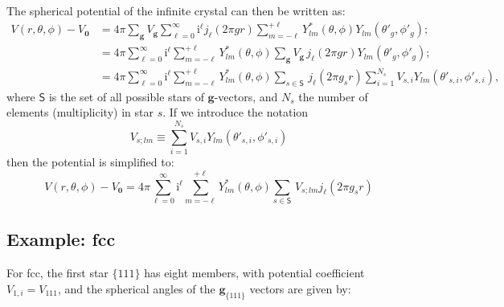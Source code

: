 \documentclass[11pt]{amsart}
\begin{document}
The spherical potential of the infinite crystal can then be written as:
\begin{align}
	V(r,\theta,\phi) - V_{\mathbf{0}} &= 
4\pi \sum_{\mathbf{g}} V_{\mathbf{g}}\sum_{\ell=0}^{\infty} \mathrm{i}^{\ell}j_{\ell}(2\pi gr)\sum_{m=-\ell}^{+\ell} Y^{\ast}_{lm}(\theta,\phi)Y_{lm}(\theta'_g,\phi'_g);\\
&= 4\pi \sum_{\ell=0}^{\infty} \mathrm{i}^{\ell} \sum_{m=-\ell}^{+\ell} Y^{\ast}_{lm}(\theta,\phi) \sum_{\mathbf{g}} V_{\mathbf{g}}\,j_{\ell}(2\pi gr)Y_{lm}(\theta'_g,\phi'_g);\\
&= 4\pi \sum_{\ell=0}^{\infty} \mathrm{i}^{\ell} \sum_{m=-\ell}^{+\ell} Y^{\ast}_{lm}(\theta,\phi) \sum_{s\in\mathsf{S}}\,j_{\ell}(2\pi g_{s}r)\sum_{i=1}^{N_s} V_{s,i}Y_{lm}(\theta'_{s,i},\phi'_{s,i}),
\end{align}
where $\mathsf{S}$ is the set of all possible stars of $\mathbf{g}$-vectors, and $N_s$ the number of elements (multiplicity) in star $s$.
If we introduce the notation 
\begin{equation}
	V_{s;lm} \equiv \sum_{i=1}^{N_s} V_{s,i}Y_{lm}(\theta'_{s,i},\phi'_{s,i})
\end{equation}
then the potential is simplified to:
\begin{equation}
	V(r,\theta,\phi) - V_{\mathbf{0}} = 
4\pi \sum_{\ell=0}^{\infty} \mathrm{i}^{\ell} \sum_{m=-\ell}^{+\ell} Y^{\ast}_{lm}(\theta,\phi) \sum_{s\in\mathsf{S}}\,V_{s;lm} j_{\ell}(2\pi g_{s}r)
\end{equation}

\subsection{Example: fcc}
For fcc, the first star $\{111\}$ has eight members, with potential coefficient $V_{1,i} = V_{111}$, and the spherical angles of the $\mathbf{g}_{\{111\}}$ vectors are 
given by:
\end{document}
